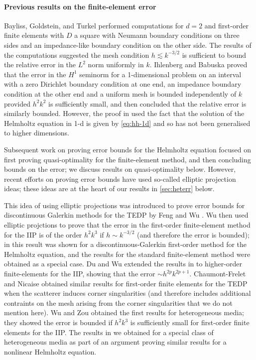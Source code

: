 \paragraph{Previous results on the finite-element error} Bayliss, Goldstein, and Turkel \cite[\S 3]{BaGoTu:85} performed computations for $d=2$ and first-order finite elements with $D$ a square with Neumann boundary conditions on three sides and an impedance-like boundary condition on the other side. The results of the computations suggested the mesh condition $h \lesssim k^{-3/2}$ is sufficient to bound the relative error in the $L^2$ norm uniformly in $k.$ Ihlenberg and Babuska \cite[Theorem 5, \S 3.4]{IhBa:95} proved that the error in the $H^1$ seminorm for a 1-dimensional problem on an interval with a zero Dirichlet boundary condition at one end, an impedance boundary condition at the other end and a uniform mesh is bounded independently of $k$ provided $h^2k^2$ is sufficiently small, and then concluded that the relative error is similarly bounded. However, the proof in \cite{IhBa:95} used the fact that the solution of the Helmholtz equation in 1-d is given by \eqref{eq:hh-1d} and so has not been generalised to higher dimensions.

Subsequent work on proving error bounds for the Helmholtz equation focused on first proving quasi-optimality for the finite-element method, and then concluding bounds on the error; we discuss results on quasi-optimality below. However, recent efforts on proving error bounds have used so-called elliptic projection ideas; these ideas are at the heart of our results in \cref{sec:heterr} below.

This idea of using elliptic projections was introduced to prove error bounds for discontinuous Galerkin methods for the TEDP by Feng and Wu \cite{FeWu:09,FeWu:11}. Wu \cite{Wu:14} then used elliptic projctions to prove that the error in the first-order finite-element method for the IIP is of the order $ h^2k^3$ if $h \sim k^{-3/2}$ (and therefore the error is bounded); in \cite{Wu:14} this result was shown for a discontinuous-Galerkin first-order method for the Helmholtz equation, and the results for the standard finite-element method were obtained as a special case. Du and Wu \cite{DuWu:15} extended the results in \cite{Wu:14} to higher-order finite-elements for the IIP, showing that the error $\sim h^{2p}k^{2p+1}.$ Chaumont-Frelet and Nicaise \cite{ChNi:18} obtained similar results for first-order finite elements for the TEDP when the scatterer induces corner singularities (and therefore \cite{ChNi:18} includes additional contraints on the mesh arising from the corner singularities that we do not mention here). Wu and Zou \cite[Lemma 3.3]{WuZo:18} obtained the first results for heterogeneous media; they showed the error is bounded if $h^2k^3$ is sufficiently small for first-order finite elements for the IIP. The results in \cite{WuZo:18} we obtained for a special class of heterogeneous media as part of an argument proving similar results for a nonlinear Helmholtz equation.

